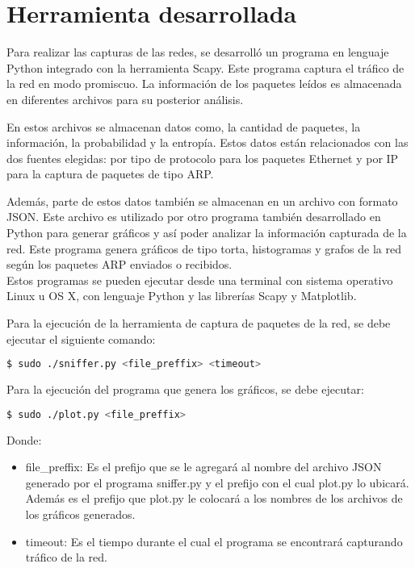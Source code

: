 \section{Herramienta desarrollada}

Para realizar las capturas de las redes, se desarrolló un programa en lenguaje Python integrado con la herramienta Scapy.
Este programa captura el tráfico de la red en modo promiscuo. La información de los paquetes leídos es almacenada en diferentes archivos para su posterior análisis.

En estos archivos se almacenan datos como, la cantidad de paquetes, la información, la probabilidad y la entropía. Estos datos están relacionados con las dos fuentes elegidas: por tipo de protocolo para los paquetes Ethernet y por IP para la captura de paquetes de tipo ARP.

Además, parte de estos datos también se almacenan en un archivo con formato JSON. Este archivo es utilizado por otro programa también desarrollado en Python para generar gráficos y así poder analizar la información capturada de la red. Este programa genera gráficos de tipo torta, histogramas y grafos de la red según los paquetes ARP enviados o recibidos.
\\

Estos programas se pueden ejecutar desde una terminal con sistema operativo Linux u OS X, con lenguaje Python y las librerías Scapy y Matplotlib.

Para la ejecución de la herramienta de captura de paquetes de la red, se debe ejecutar el siguiente comando:

\begin{lstlisting}[language=bash]
  $ sudo ./sniffer.py <file_preffix> <timeout> 
\end{lstlisting}

Para la ejecución del programa que genera los gráficos, se debe ejecutar:

\begin{lstlisting}[language=bash]
  $ sudo ./plot.py <file_preffix> 
\end{lstlisting}

Donde:

\begin{itemize}
\item file\_preffix: Es el prefijo que se le agregará al nombre del archivo JSON generado por el programa sniffer.py y el prefijo con el cual plot.py lo ubicará. Además es el prefijo que plot.py le colocará a los nombres de los archivos de los gráficos generados.
\item timeout: Es el tiempo durante el cual el programa se encontrará capturando tráfico de la red.
\end{itemize}